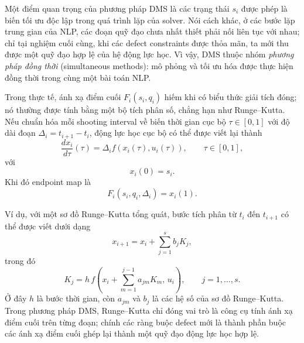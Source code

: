 Một điểm quan trọng của phương pháp DMS là các trạng thái $s_i$ được phép là biến tối ưu độc lập
trong quá trình lặp của solver.
Nói cách khác, ở các bước lặp trung gian của NLP, các đoạn quỹ đạo chưa nhất thiết phải nối liên
tục với nhau; chỉ tại nghiệm cuối cùng, khi các defect constraints được thỏa mãn, ta mới thu được
một quỹ đạo hợp lệ của hệ động lực học.
Vì vậy, DMS thuộc nhóm \textit{phương pháp đồng thời} (simultaneous methods): mô phỏng và tối ưu
hóa được thực hiện đồng thời trong cùng một bài toán NLP.


Trong thực tế, ánh xạ điểm cuối $F_i(s_i,q_i)$ hiếm khi có biểu thức giải tích đóng; nó thường
được tính bằng một bộ tích phân số, chẳng hạn như Runge--Kutta.
Nếu chuẩn hóa mỗi shooting interval về biến thời gian cục bộ $\tau \in [0,1]$ với độ dài đoạn
$\Delta_i = t_{i+1} - t_i$, động lực học cục bộ có thể được viết lại thành
\begin{equation}
\frac{dx_i}{d\tau}(\tau)
=
\Delta_i f(x_i(\tau),u_i(\tau)),
\qquad \tau\in[0,1],
\label{eq:normalized_local_dynamics}
\end{equation}
với
\begin{equation}
x_i(0)=s_i.
\label{eq:normalized_initial_state}
\end{equation}
Khi đó endpoint map là
\begin{equation}
F_i(s_i,q_i,\Delta_i)=x_i(1).
\label{eq:normalized_endpoint_map}
\end{equation}

Ví dụ, với một sơ đồ Runge--Kutta tổng quát, bước tích phân từ $t_i$ đến $t_{i+1}$ có thể được
viết dưới dạng
\begin{equation}
x_{i+1}
=
x_i+\sum_{j=1}^{s} b_j K_j,
\label{eq:rk_update}
\end{equation}
trong đó
\begin{equation}
K_j
=
h\,f\left(
x_i+\sum_{m=1}^{j-1}a_{jm}K_m,\,
u_i
\right),
\qquad j=1,\ldots,s.
\label{eq:rk_stages}
\end{equation}
Ở đây $h$ là bước thời gian, còn $a_{jm}$ và $b_j$ là các hệ số của sơ đồ Runge--Kutta.
Trong phương pháp DMS, Runge--Kutta chỉ đóng vai trò là công cụ tính ánh xạ điểm cuối trên từng
đoạn; chính các ràng buộc defect mới là thành phần buộc các ánh xạ điểm cuối ghép lại thành một
quỹ đạo động lực học hợp lệ.

